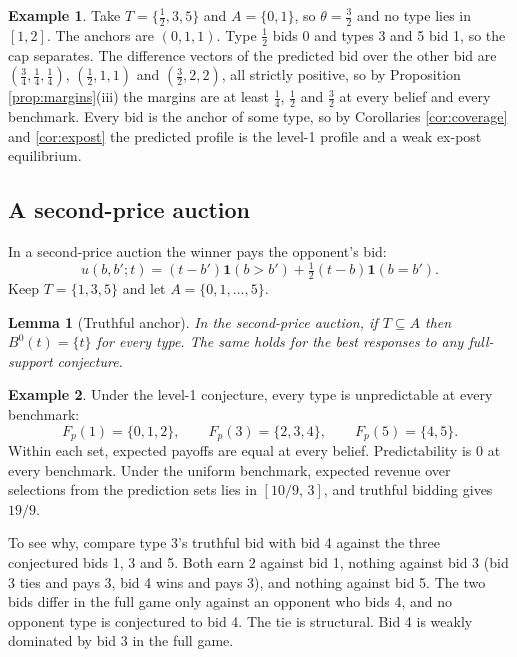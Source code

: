 \documentclass[12pt]{article}
\newtheorem{lemma}{Lemma}
\theoremstyle{definition}
\newtheorem{example}{Example}
\begin{document}
\begin{example}\label{ex:strict}
Take $T = \{\tfrac12, 3, 5\}$ and $A = \{0, 1\}$, so $\theta = \tfrac32$ and no type lies in $[1, 2]$. The anchors are $(0, 1, 1)$. Type $\tfrac12$ bids 0 and types 3 and 5 bid 1, so the cap separates. The difference vectors of the predicted bid over the other bid are $(\tfrac34, \tfrac14, \tfrac14)$, $(\tfrac12, 1, 1)$ and $(\tfrac32, 2, 2)$, all strictly positive, so by Proposition \ref{prop:margins}(iii) the margins are at least $\tfrac14$, $\tfrac12$ and $\tfrac32$ at every belief and every benchmark. Every bid is the anchor of some type, so by Corollaries \ref{cor:coverage} and \ref{cor:expost} the predicted profile is the level-1 profile and a weak ex-post equilibrium.
\end{example}

\subsection{A second-price auction}\label{sec:spa}

In a second-price auction the winner pays the opponent's bid:
\[
u(b, b'; t) = (t - b')\mathbf{1}(b > b') + \tfrac12 (t - b)\mathbf{1}(b = b').
\]
Keep $T = \{1,3,5\}$ and let $A = \{0, 1, \dots, 5\}$.

\begin{lemma}[Truthful anchor]\label{lem:truthful}
In the second-price auction, if $T \subseteq A$ then $B^0(t) = \{t\}$ for every type. The same holds for the best responses to any full-support conjecture.
\end{lemma}

\begin{example}\label{ex:spa}
Under the level-1 conjecture, every type is unpredictable at every benchmark:
\[
F_p(1) = \{0, 1, 2\}, \qquad F_p(3) = \{2, 3, 4\}, \qquad F_p(5) = \{4, 5\}.
\]
Within each set, expected payoffs are equal at every belief. Predictability is $0$ at every benchmark. Under the uniform benchmark, expected revenue over selections from the prediction sets lies in $[10/9,\, 3]$, and truthful bidding gives $19/9$.
\end{example}

To see why, compare type 3's truthful bid with bid 4 against the three conjectured bids 1, 3 and 5. Both earn $2$ against bid 1, nothing against bid 3 (bid 3 ties and pays 3, bid 4 wins and pays 3), and nothing against bid 5. The two bids differ in the full game only against an opponent who bids 4, and no opponent type is conjectured to bid 4. The tie is structural. Bid 4 is weakly dominated by bid 3 in the full game.
\end{document}
